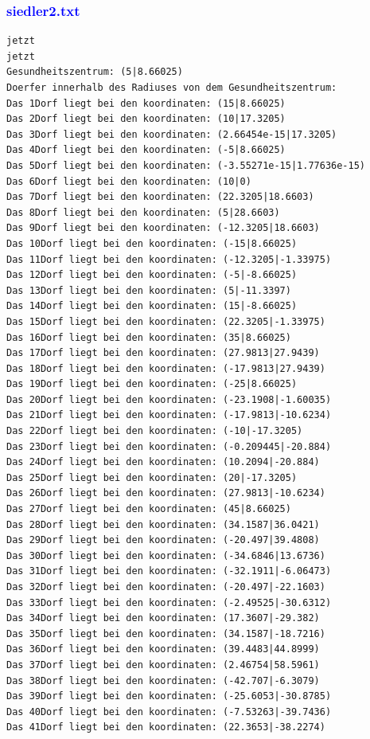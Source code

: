 \documentclass{article}
\begin{document}
\subsubsection{\textcolor{blue}{siedler2.txt}}
\begin{verbatim}
jetzt
jetzt
Gesundheitszentrum: (5|8.66025)
Doerfer innerhalb des Radiuses von dem Gesundheitszentrum: 
Das 1Dorf liegt bei den koordinaten: (15|8.66025)
Das 2Dorf liegt bei den koordinaten: (10|17.3205)
Das 3Dorf liegt bei den koordinaten: (2.66454e-15|17.3205)
Das 4Dorf liegt bei den koordinaten: (-5|8.66025)
Das 5Dorf liegt bei den koordinaten: (-3.55271e-15|1.77636e-15)
Das 6Dorf liegt bei den koordinaten: (10|0)
Das 7Dorf liegt bei den koordinaten: (22.3205|18.6603)
Das 8Dorf liegt bei den koordinaten: (5|28.6603)
Das 9Dorf liegt bei den koordinaten: (-12.3205|18.6603)
Das 10Dorf liegt bei den koordinaten: (-15|8.66025)
Das 11Dorf liegt bei den koordinaten: (-12.3205|-1.33975)
Das 12Dorf liegt bei den koordinaten: (-5|-8.66025)
Das 13Dorf liegt bei den koordinaten: (5|-11.3397)
Das 14Dorf liegt bei den koordinaten: (15|-8.66025)
Das 15Dorf liegt bei den koordinaten: (22.3205|-1.33975)
Das 16Dorf liegt bei den koordinaten: (35|8.66025)
Das 17Dorf liegt bei den koordinaten: (27.9813|27.9439)
Das 18Dorf liegt bei den koordinaten: (-17.9813|27.9439)
Das 19Dorf liegt bei den koordinaten: (-25|8.66025)
Das 20Dorf liegt bei den koordinaten: (-23.1908|-1.60035)
Das 21Dorf liegt bei den koordinaten: (-17.9813|-10.6234)
Das 22Dorf liegt bei den koordinaten: (-10|-17.3205)
Das 23Dorf liegt bei den koordinaten: (-0.209445|-20.884)
Das 24Dorf liegt bei den koordinaten: (10.2094|-20.884)
Das 25Dorf liegt bei den koordinaten: (20|-17.3205)
Das 26Dorf liegt bei den koordinaten: (27.9813|-10.6234)
Das 27Dorf liegt bei den koordinaten: (45|8.66025)
Das 28Dorf liegt bei den koordinaten: (34.1587|36.0421)
Das 29Dorf liegt bei den koordinaten: (-20.497|39.4808)
Das 30Dorf liegt bei den koordinaten: (-34.6846|13.6736)
Das 31Dorf liegt bei den koordinaten: (-32.1911|-6.06473)
Das 32Dorf liegt bei den koordinaten: (-20.497|-22.1603)
Das 33Dorf liegt bei den koordinaten: (-2.49525|-30.6312)
Das 34Dorf liegt bei den koordinaten: (17.3607|-29.382)
Das 35Dorf liegt bei den koordinaten: (34.1587|-18.7216)
Das 36Dorf liegt bei den koordinaten: (39.4483|44.8999)
Das 37Dorf liegt bei den koordinaten: (2.46754|58.5961)
Das 38Dorf liegt bei den koordinaten: (-42.707|-6.3079)
Das 39Dorf liegt bei den koordinaten: (-25.6053|-30.8785)
Das 40Dorf liegt bei den koordinaten: (-7.53263|-39.7436)
Das 41Dorf liegt bei den koordinaten: (22.3653|-38.2274)

\end{verbatim}
\end{document}
